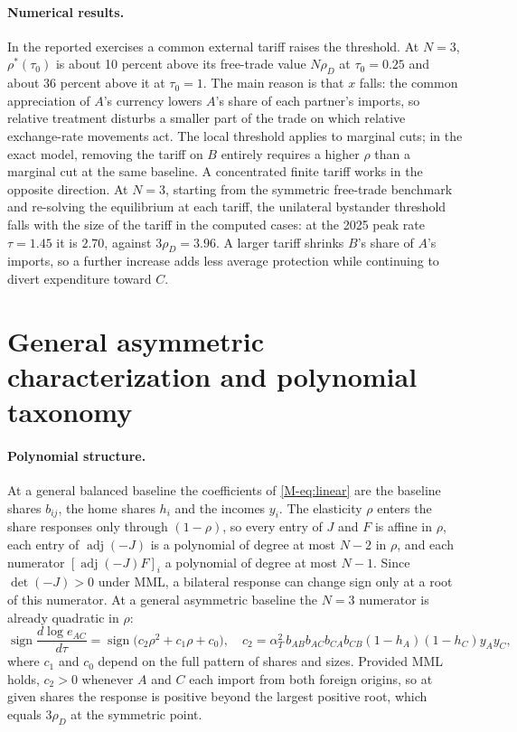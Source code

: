 \documentclass[11pt]{article}
\numberwithin{equation}{section}
\theoremstyle{plain}
\DeclareMathOperator{\adj}{adj}
\begin{document}
\paragraph{Numerical results.} In the reported exercises a common external tariff raises the threshold. At $N=3$, $\rho^*(\tau_0)$ is about 10 percent above its free-trade value $N\rho_D$ at $\tau_0=0.25$ and about 36 percent above it at $\tau_0=1$. The main reason is that $x$ falls: the common appreciation of $A$'s currency lowers $A$'s share of each partner's imports, so relative treatment disturbs a smaller part of the trade on which relative exchange-rate movements act. The local threshold applies to marginal cuts; in the exact model, removing the tariff on $B$ entirely requires a higher $\rho$ than a marginal cut at the same baseline. A concentrated finite tariff works in the opposite direction. At $N=3$, starting from the symmetric free-trade benchmark and re-solving the equilibrium at each tariff, the unilateral bystander threshold falls with the size of the tariff in the computed cases: at the 2025 peak rate $\tau=1.45$ it is $2.70$, against $3\rho_D=3.96$. A larger tariff shrinks $B$'s share of $A$'s imports, so a further increase adds less average protection while continuing to divert expenditure toward $C$.

\section{General asymmetric characterization and polynomial taxonomy}

\paragraph{Polynomial structure.} At a general balanced baseline the coefficients of \cref{M-eq:linear} are the baseline shares $b_{ij}$, the home shares $h_i$ and the incomes $y_i$. The elasticity $\rho$ enters the share responses only through $(1-\rho)$, so every entry of $J$ and $F$ is affine in $\rho$, each entry of $\adj(-J)$ is a polynomial of degree at most $N-2$ in $\rho$, and each numerator $[\adj(-J)F]_i$ a polynomial of degree at most $N-1$. Since $\det(-J)>0$ under MML, a bilateral response can change sign only at a root of this numerator. At a general asymmetric baseline the $N=3$ numerator is already quadratic in $\rho$:
\begin{equation}
\operatorname{sign}\frac{d\log e_{AC}}{d\tau}=\operatorname{sign}\big(c_2\rho^2+c_1\rho+c_0\big),\quad c_2=\alpha_T^2\,b_{AB}b_{AC}b_{CA}b_{CB}(1-h_A)(1-h_C)y_Ay_C,
\end{equation}
where $c_1$ and $c_0$ depend on the full pattern of shares and sizes. Provided MML holds, $c_2>0$ whenever $A$ and $C$ each import from both foreign origins, so at given shares the response is positive beyond the largest positive root, which equals $3\rho_D$ at the symmetric point.
\end{document}
